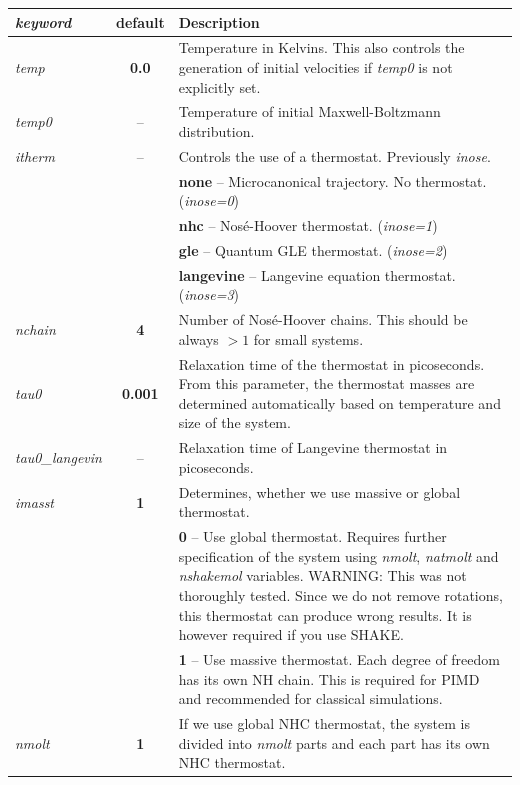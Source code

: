 \noindent\begin{tabularx}{\textwidth}{lcX}
\textit{keyword} & \textbf{default} & Description \\
\hline
\textit{temp} & \textbf{0.0} &  Temperature in Kelvins.
This also controls the generation of initial velocities if \textit{temp0} is not explicitly set. \\ 
\textit{temp0} & -- &  Temperature of initial Maxwell-Boltzmann distribution. \\
\textit{itherm} & -- &  Controls the use of a thermostat. Previously \textit{inose}. \\
& & \textbf{none} -- Microcanonical trajectory. No thermostat. (\textit{inose=0}) \\
& & \textbf{nhc} -- Nos\'{e}-Hoover thermostat. (\textit{inose=1})\\
& & \textbf{gle} -- Quantum GLE thermostat. (\textit{inose=2})\\
& & \textbf{langevine} -- Langevine equation thermostat. (\textit{inose=3})\\

\textit{nchain} & \textbf{4} & Number of Nos\'{e}-Hoover chains. This should be always $>1$ for small systems. \\

\textit{tau0} & \textbf{0.001} & Relaxation time of the thermostat in picoseconds. From this parameter, 
the thermostat masses are determined automatically based on temperature and size of the system.\cite{Tuckerman_book} \\

\colorbox{black!20}{\textit{tau0\_langevin}}  & -- & Relaxation time of Langevine thermostat in picoseconds. \\

\textit{imasst} & \textbf{1} & Determines, whether we use massive or global thermostat. \\
& & \textbf{0} -- Use global thermostat.
Requires further specification of the system using \textit{nmolt}, \textit{natmolt} and \textit{nshakemol} variables.
WARNING: This was not thoroughly tested.
Since we do not remove rotations, this thermostat can produce wrong results. It is however required if you use SHAKE.\\
& & \textbf{1} -- Use massive thermostat. Each degree of freedom has its own NH chain.
This is required for PIMD and recommended for classical simulations. \\

\textit{nmolt} & \textbf{1} & If we use global NHC thermostat, the system is divided into \textit{nmolt} parts
and each part has its own NHC thermostat. \\


\end{tabularx}
